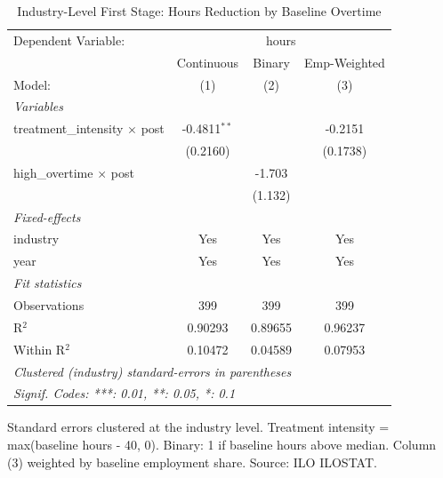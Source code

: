 
\begin{table}[htbp]
   \caption{\label{tab:industry} Industry-Level First Stage: Hours Reduction by Baseline Overtime}
   \centering
   \begin{tabular}{lccc}
      \tabularnewline \midrule \midrule
      Dependent Variable: & \multicolumn{3}{c}{hours}\\
                                           & Continuous     & Binary  & Emp-Weighted \\   
      Model:                               & (1)            & (2)     & (3)\\  
      \midrule
      \emph{Variables}\\
      treatment\_intensity $\times$ post   & -0.4811$^{**}$ &         & -0.2151\\   
                                           & (0.2160)       &         & (0.1738)\\   
      high\_overtime $\times$ post         &                & -1.703  &   \\   
                                           &                & (1.132) &   \\   
      \midrule
      \emph{Fixed-effects}\\
      industry                             & Yes            & Yes     & Yes\\  
      year                                 & Yes            & Yes     & Yes\\  
      \midrule
      \emph{Fit statistics}\\
      Observations                         & 399            & 399     & 399\\  
      R$^2$                                & 0.90293        & 0.89655 & 0.96237\\  
      Within R$^2$                         & 0.10472        & 0.04589 & 0.07953\\  
      \midrule \midrule
      \multicolumn{4}{l}{\emph{Clustered (industry) standard-errors in parentheses}}\\
      \multicolumn{4}{l}{\emph{Signif. Codes: ***: 0.01, **: 0.05, *: 0.1}}\\
   \end{tabular}
   
   \par \raggedright 
   Standard errors clustered at the industry level. Treatment intensity = max(baseline hours - 40, 0). Binary: 1 if baseline hours above median. Column (3) weighted by baseline employment share. Source: ILO ILOSTAT.
\end{table}


